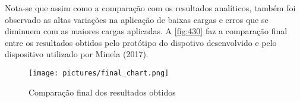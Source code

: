 \begin{table}[H]
    \caption{Comparação entre os resultados obtidos com os obtidos por Minela (2017)}
    \label{tab:ResultadosComparacao}
    \centering
\end{table}

Nota-se que assim como a comparação com os resultados analíticos, também foi observado as altas variações na aplicação de baixas cargas e erros que se diminuem com as maiores cargas
aplicadas.
A \autoref{fig:430} faz a comparação final entre os resultados obtidos pelo protótipo do dispotivo desenvolvido e pelo dispositivo utilizado por Minela (2017).

\begin{figure}[H]
	\caption{\label{fig:430} Comparação final dos resultados obtidos}
	\begin{center}
		\texttt{[image: pictures/final\_chart.png]}
	\end{center}
\end{figure}

